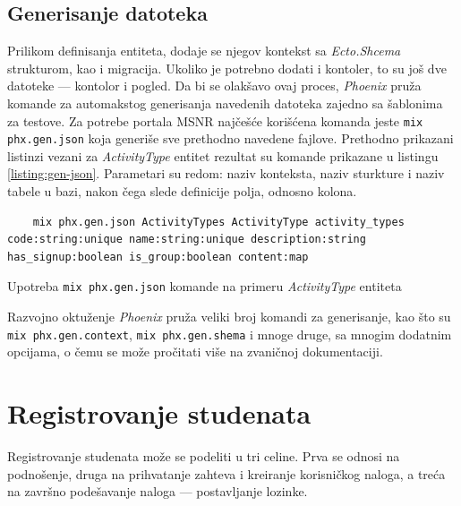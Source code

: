 \documentclass[12pt,oneside]{memoir}
\begin{document}
\subsection{Generisanje datoteka}
Prilikom definisanja entiteta, dodaje se njegov kontekst sa \emph{Ecto.Shcema} strukturom, kao i migracija. 
Ukoliko je potrebno dodati i kontoler, to su još dve datoteke --- kontolor i pogled. Da bi se olakšavo ovaj
proces, \emph{Phoenix} pruža komande za automakstog generisanja navedenih datoteka zajedno sa šablonima za testove.
Za potrebe portala MSNR najčešće korišćena komanda jeste \texttt{mix phx.gen.json} koja generiše sve prethodno
navedene fajlove. Prethodno prikazani listinzi vezani za \emph{ActivityType} entitet rezultat su komande prikazane u
listingu \ref{listing:gen-json}. Parametari su redom: naziv konteksta, naziv sturkture i naziv tabele u bazi, nakon čega slede
definicije polja, odnosno kolona.
\begin{listing}[h]
  \begin{verbatim}
    mix phx.gen.json ActivityTypes ActivityType activity_types code:string:unique name:string:unique description:string has_signup:boolean is_group:boolean content:map
  \end{verbatim}
\caption{Upotreba \texttt{mix phx.gen.json} komande na primeru \emph{ActivityType} entiteta}
\label{listing:gen-json}
\end{listing}
Razvojno oktuženje \emph{Phoenix} pruža veliki broj komandi za generisanje, kao što su \texttt{mix phx.gen.context}, 
\texttt{mix phx.gen.shema} i mnoge druge, sa mnogim dodatnim opcijama, o čemu se može pročitati više na zvaničnoj dokumentaciji.

\section{Registrovanje studenata}
Registrovanje studenata može se podeliti u tri celine. Prva se odnosi na podnošenje, druga na prihvatanje
zahteva i kreiranje korisničkog naloga, a treća na završno podešavanje naloga --- postavljanje lozinke.
\end{document}

